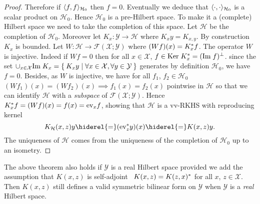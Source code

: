 \begin{proof}
Therefore if $\langle f,f\rangle_{\mathcal{H}_0}$ then $f=0$. Eventually we deduce that $\langle\cdot,\cdot\rangle_{\mathcal{H}_0}$ is a scalar product on $\mathcal{H}_0$. Hence $\mathcal{H}_0$ is a pre-Hilbert space. To make it a (complete) Hilbert space we need to take the completion of this space. Let $\mathcal{H}$ be the completion of $\mathcal{H}_0$. Moreover let $K_x:\mathcal{Y}\to\mathcal{H}$ where $K_xy=K_{x,y}$. By construction $K_x$ is bounded. Let $W:\mathcal{H}\to\mathcal{F}(\mathcal{X};\mathcal{Y})$ where $(Wf)(x)=K_x^* f$. The operator $W$ is injective. Indeed if $Wf=0$ then for all $x\in\mathcal{X}$, $f\in\text{Ker}\; K_x^*=(\text{Im}\; f)^{\perp}$. since the set $\cup_{x\in\mathcal{X}}\text{Im}\; K_x=\Set{K_xy|\forall x\in\mathcal{X}, \forall y\in\mathcal{Y}}$ generates by definition $\mathcal{H}_0$, we have $f=0$. Besides, as $W$ is injective, we have for all $f_1$, $f_2\in\mathcal{H}_0$ $(Wf_1)(x)=(Wf_2)(x){\scriptstyle\implies} f_1(x)=f_2(x)$ pointwise in $\mathcal{H}$ so that we can identify $\mathcal{H}$ with a \emph{subspace} of $\mathcal{F}(\mathcal{X};\mathcal{Y})$. Hence $K_x^* f=(Wf)(x)=f(x)=\text{ev}_xf$, showing that $\mathcal{H}$ is a \acl{vv-RKHS} with reproducing kernel
\begin{dmath*}
K_{\mathcal{H}}(x,z)y\hiderel{=}(\text{ev}^\adjoint_zy)(x)\hiderel{=}K(x,z)y.
\end{dmath*}
The uniqueness of $\mathcal{H}$ comes from the uniqueness of the completion of $\mathcal{H}_0$ up to an isometry.
\end{proof}
The above theorem also holds if $\mathcal{Y}$ is a real Hilbert space provided we add the assumption that $K(x,z)$ is self-adjoint \ie~$K(x,z)=K(z,x)^*$ for all $x$, $z\in\mathcal{X}$. Then $K(x,z)$ still defines a valid symmetric bilinear form on $\mathcal{Y}$ when $\mathcal{Y}$ is a \emph{real} Hilbert space.
